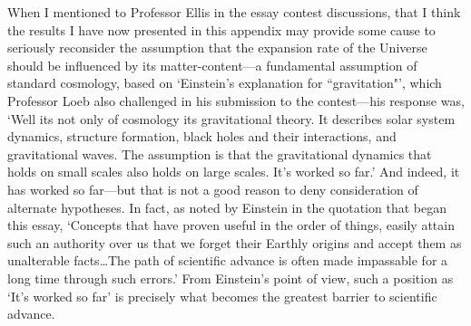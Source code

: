 \documentclass[11pt]{article}
\begin{document}
\begin{appendix}
When I mentioned to Professor Ellis in the essay contest discussions, that I think the results I have now presented in this appendix may provide some cause to seriously reconsider the assumption that the expansion rate of the Universe should be influenced by its matter-content---a fundamental assumption of standard cosmology, based on `Einstein's explanation for ``gravitation"', which Professor Loeb also challenged in his submission to the contest---his response was, `Well its not only of cosmology its gravitational theory. It describes solar system dynamics, structure formation, black holes and their interactions, and gravitational waves. The assumption is that the gravitational dynamics that holds on small scales also holds on large scales. It's worked so far.' And indeed, it has worked so far---but that is not a good reason to deny consideration of alternate hypotheses. In fact, as noted by Einstein in the quotation that began this essay, `Concepts that have proven useful in the order of things, easily attain such an authority over us that we forget their Earthly origins and accept them as unalterable facts\ldots The path of scientific advance is often made impassable for a long time through such errors.' From Einstein's point of view, such a position as `It's worked so far' is precisely what becomes the greatest barrier to scientific advance. 


\end{appendix}
\end{document}
